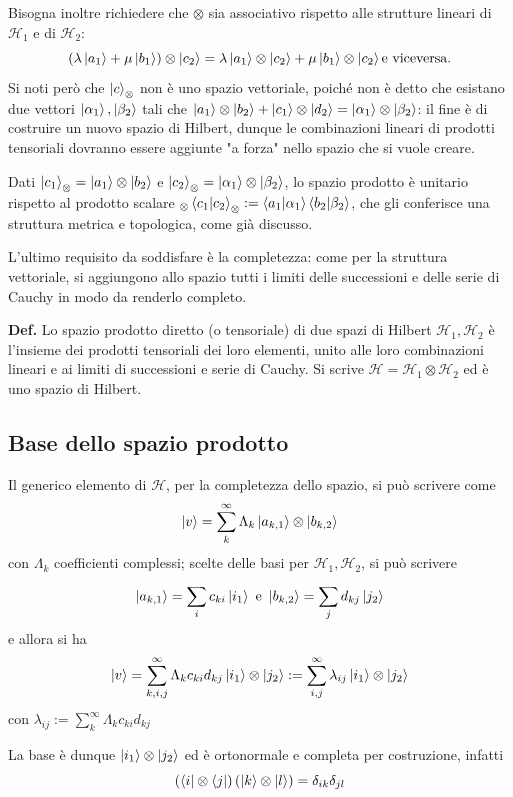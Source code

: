 Bisogna inoltre richiedere che $\otimes$ sia associativo rispetto alle strutture
lineari di $\mathcal{H}_1$ e di $\mathcal{H}_2$:\\
$$(\lambda\ket{a_1} + \mu\ket{b_1})\otimes\ket{c_2} =
\lambda\ket{a_1}\otimes\ket{c_2} + \mu\ket{b_1}\otimes\ket{c_2} \text{e viceversa.}$$
Si noti però che ${\ket{c}_\otimes}$ non è uno spazio vettoriale, poiché non è detto
che esistano due vettori $\ket{\alpha_1},\ket{\beta_2}$ tali che
$\ket{a_1}\otimes\ket{b_2} + \ket{c_1}\otimes\ket{d_2} =
\ket{\alpha_1}\otimes\ket{\beta_2}$: il fine è di costruire un nuovo spazio di
Hilbert, dunque le combinazioni lineari di prodotti tensoriali dovranno essere 
aggiunte "a forza" nello spazio che si vuole creare.

Dati $\ket{c_1}_\otimes=\ket{a_1}\otimes\ket{b_2}$ e $\ket{c_2}_\otimes=\ket{\alpha_1}\otimes\ket{\beta_2}$,
lo spazio prodotto è unitario rispetto al prodotto scalare
$_\otimes\bra{c_1}\ket{c_2}_\otimes :=
\bra{a_1}\ket{\alpha_1}\bra{b_2}\ket{\beta_2}$, che gli conferisce una struttura
metrica e topologica, come già discusso.

L'ultimo requisito da soddisfare è la completezza: come per la struttura vettoriale,
si aggiungono allo spazio tutti i limiti delle successioni e delle serie di Cauchy 
in modo da renderlo completo.

\textbf{Def.} Lo spazio prodotto diretto (o tensoriale) di due spazi di Hilbert 
$\mathcal{H}_1,\mathcal{H}_2$ è l'insieme dei prodotti tensoriali dei loro elementi,
unito alle loro combinazioni lineari e ai limiti di successioni e serie di Cauchy.
Si scrive $\mathcal{H}=\mathcal{H}_1\otimes\mathcal{H}_2$ ed è uno spazio di Hilbert.
\subsection{Base dello spazio prodotto}
Il generico elemento di $\mathcal{H}$, per la completezza dello spazio, si può
scrivere come
$$\ket{v}=\sum_{k}^{\infty} \Lambda_k\ket{a_{k,1}}\otimes\ket{b_{k,2}}$$
con $\Lambda_k$ coefficienti complessi; scelte delle basi per $\mathcal{H}_1
,\mathcal{H}_2$, si può scrivere
$$\ket{a_{k,1}} = \sum_{i}^{}c_{ki}\ket{i_1} \text{ e }
\ket{b_{k,2}} = \sum_{j}^{}d_{kj}\ket{j_2}$$ 
e allora si ha
$$
\ket{v} = \sum_{k,i,j}^{\infty} \Lambda_k c_{ki}d_{kj}\ket{i_1}\otimes\ket{j_2} :=
\sum_{i,j}^{\infty} \lambda_{ij}\ket{i_1}\otimes\ket{j_2}
$$
con $\lambda_{ij}:=\sum_{k}^{\infty}\Lambda_k c_{ki} d_{kj}$

La base è dunque $\ket{i_1}\otimes\ket{j_2}$ ed è ortonormale e completa per costruzione,
infatti 
$$\left(\bra{i}\otimes\bra{j}\right)\left(\ket{k}\otimes\ket{l}\right) = \delta_{ik}\delta_{jl}$$

